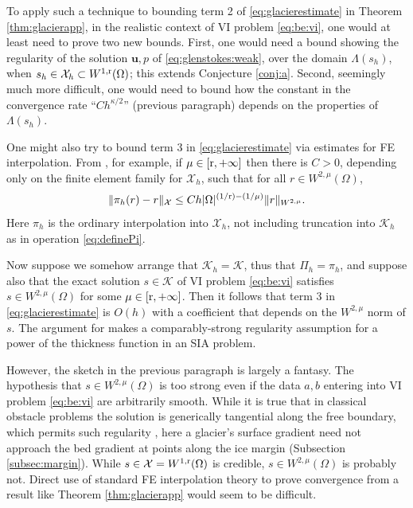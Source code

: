 \documentclass[hidelinks,onefignum,onetabnum,final]{siamart220329}  %
\newcommand{\bu}{\mathbf{u}}
\newcommand{\cK}{\mathcal{K}}
\newcommand{\cX}{\mathcal{X}}
\newcommand{\rr}{{\text{\textnormal{r}}}}
\begin{document}
To apply such a technique to bounding term 2 of \eqref{eq:glacierestimate} in Theorem \ref{thm:glacierapp}, in the realistic context of VI problem \eqref{eq:be:vi}, one would at least need to prove two new bounds.  First, one would need a bound showing the regularity of the solution $\bu,p$ of \eqref{eq:glenstokes:weak}, over the domain $\Lambda(s_h)$, when $s_h \in \cX_h \subset W^{1,\rr}(\Omega)$; this extends Conjecture \ref{conj:a}.  Second, seemingly much more difficult, one would need to bound how the constant in the convergence rate ``$C h^{\kappa/2}$'' (previous paragraph) depends on the properties of $\Lambda(s_h)$.

One might also try to bound term 3 in \eqref{eq:glacierestimate} via estimates for FE interpolation.  From \cite[Theorem 3.1.6]{Ciarlet2002}, for example, if $\mu \in [\rr,+\infty]$ then there is $C>0$, depending only on the finite element family for $\cX_h$, such that for all $r \in W^{2,\mu}(\Omega)$,
\begin{equation}
\|\pi_h(r) - r\|_{\cX} \le C h |\Omega|^{(1/\rr)-(1/\mu)} \|r\|_{W^{2,\mu}}. \label{eq:ciarletregularity}
\end{equation}
Here $\pi_h$ is the ordinary interpolation into $\cX_h$, not including truncation into $\cK_h$ as in operation \eqref{eq:definePi}.

Now suppose we somehow arrange that $\cK_h=\cK$, thus that $\Pi_h=\pi_h$, and suppose also that the exact solution $s\in\cK$ of VI problem \eqref{eq:be:vi} satisfies $s\in W^{2,\mu}(\Omega)$ for some $\mu \in [\rr,+\infty]$.  Then it follows that term 3 in \eqref{eq:glacierestimate} is $O(h)$ with a coefficient that depends on the $W^{2,\mu}$ norm of $s$.  The argument for \cite[Theorem 4.3]{JouvetBueler2012} makes a comparably-strong regularity assumption for a power of the thickness function in an SIA problem.

However, the sketch in the previous paragraph is largely a fantasy.  The hypothesis that $s\in W^{2,\mu}(\Omega)$ is too strong even if the data $a,b$ entering into VI problem \eqref{eq:be:vi} are arbitrarily smooth.  While it is true that in classical obstacle problems the solution is generically tangential along the free boundary, which permits such regularity \cite[Chapter IV]{KinderlehrerStampacchia1980}, here a glacier's surface gradient need not approach the bed gradient at points along the ice margin (Subsection \ref{subsec:margin}).  While $s \in \cX = W^{1,\rr}(\Omega)$ is credible, $s\in W^{2,\mu}(\Omega)$ is probably not.  Direct use of standard FE interpolation theory to prove convergence from a result like Theorem \ref{thm:glacierapp} would seem to be difficult.
\end{document}
